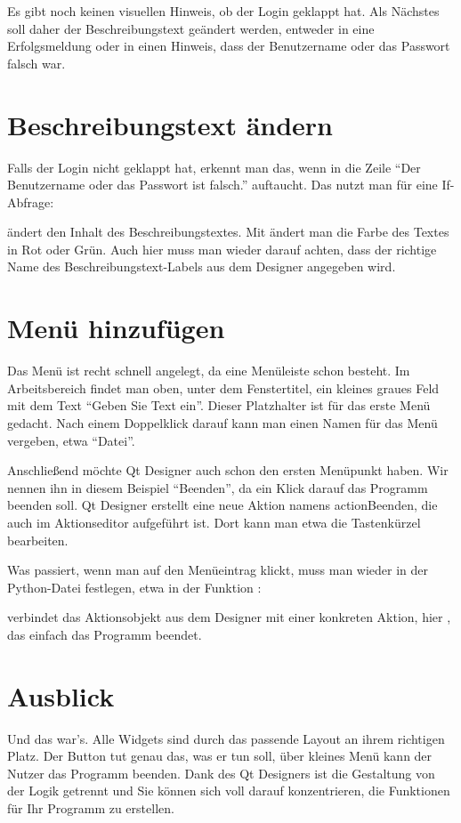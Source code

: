 Es gibt noch keinen visuellen Hinweis, ob der Login geklappt hat. Als Nächstes soll daher der Beschreibungstext geändert werden, entweder in eine Erfolgsmeldung oder in einen Hinweis, dass der Benutzername oder das Passwort falsch war.


\section{Beschreibungstext ändern}

Falls der Login nicht geklappt hat, erkennt man das, wenn in  die Zeile ``Der Benutzername oder das Passwort ist falsch.'' auftaucht. Das nutzt man für eine If-Abfrage:

\medskip


\medskip

 ändert den Inhalt des Beschreibungstextes. Mit  ändert man die Farbe des Textes in Rot oder Grün. Auch hier muss man wieder darauf achten, dass der richtige Name des Beschreibungstext-Labels aus dem Designer angegeben wird.

\section{Menü hinzufügen}

Das Menü ist recht schnell angelegt, da eine Menüleiste schon besteht. Im Arbeitsbereich findet man oben, unter dem Fenstertitel, ein kleines graues Feld mit dem Text ``Geben Sie Text ein''. Dieser Platzhalter ist für das erste Menü gedacht. Nach einem Doppelklick darauf kann man einen Namen für das Menü vergeben, etwa ``Datei''.

Anschließend möchte Qt Designer auch schon den ersten Menüpunkt haben. Wir nennen ihn in diesem Beispiel ``Beenden'', da ein Klick darauf das Programm beenden soll. Qt Designer erstellt eine neue Aktion namens actionBeenden, die auch im Aktionseditor aufgeführt ist. Dort kann man etwa die Tastenkürzel bearbeiten.

Was passiert, wenn man auf den Menüeintrag klickt, muss man wieder in der Python-Datei festlegen, etwa in der Funktion :

\medskip


\medskip

 verbindet das Aktionsobjekt  aus dem Designer mit einer konkreten Aktion, hier , das einfach das Programm beendet.

\section{Ausblick}

Und das war's. Alle Widgets sind durch das passende Layout an ihrem richtigen Platz. Der Button tut genau das, was er tun soll, über kleines Menü kann der Nutzer das Programm beenden. Dank des Qt Designers ist die Gestaltung von der Logik getrennt und Sie können sich voll darauf konzentrieren, die Funktionen für Ihr Programm zu erstellen.
